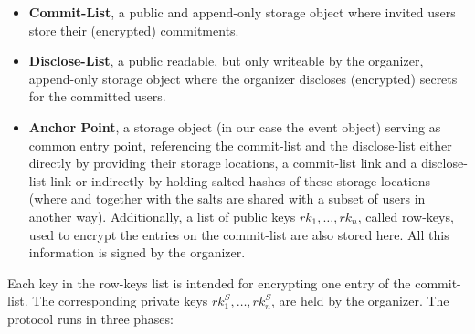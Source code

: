 \begin{itemize}

	\item \textbf{Commit-List}, 
		a public and append-only storage object where invited users
		store their (encrypted) commitments.

	\item \textbf{Disclose-List},
		a public readable, but only writeable by the organizer,
		append-only storage object where the organizer discloses
		(encrypted) secrets for the committed users.

	\item \textbf{Anchor Point},
		a storage object (in our case the event object) serving as
		common entry point, referencing the commit-list and the
		disclose-list either directly by providing their storage
		locations, \ie a commit-list link \CLL{} and a disclose-list
		link \DLL{} or indirectly by holding salted hashes of these
		storage locations (where \DLL{} and \CLL{} together with the
		salts are shared with a subset of users in another way).
		Additionally, a list of public keys $rk_1, \dots, rk_n$, 
		called row-keys, used to encrypt the entries on the
		commit-list	are also stored here. 	
		All this information is signed by the organizer. %

\end{itemize}

\noindent Each key in the row-keys list is intended for encrypting one entry of the commit-list.
The corresponding private keys $rk_1^S, \dots, rk_n^S$, are held by the organizer.
%
The protocol runs in three phases:


